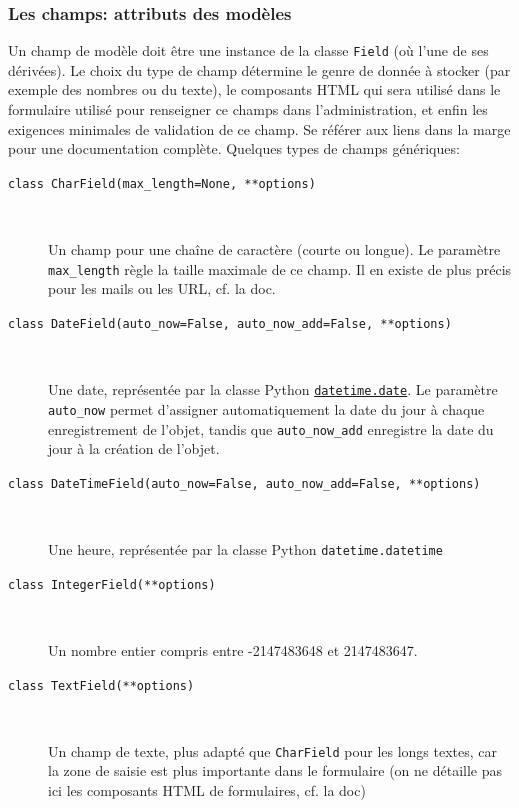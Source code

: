 \documentclass[a4paper, 10pt]{article}
\begin{document}
{\subsubsection{Les champs: attributs des modèles}

Un champ  de modèle doit être une instance de la classe \texttt{Field} (où l'une de ses dérivées). Le choix du type de champ détermine le genre de donnée à stocker (par exemple des nombres ou du texte), le composants HTML qui sera utilisé dans le formulaire utilisé pour renseigner ce champs dans l'administration, et enfin les exigences minimales de validation de ce champ. Se référer aux liens dans la marge pour une documentation complète. Quelques types de champs génériques:
\begin{description}
    \item[\texttt{class CharField(max_length=None, **options)}]~

    Un champ pour une chaîne de caractère (courte ou longue). Le paramètre \texttt{max\_length} règle la taille maximale de ce champ. Il en existe de plus précis pour les mails ou les URL, cf. la doc.

    \item[\texttt{class DateField(auto_now=False, auto_now_add=False, **options)}]~

    Une date, représentée par la classe Python \hyperref[datetime]{\texttt{datetime.date}}. Le paramètre \texttt{auto\_now} permet d'assigner automatiquement la date du jour à chaque enregistrement de l'objet, tandis que \texttt{auto\_now\_add} enregistre la date du jour à la création de l'objet.

    \item[\texttt{class DateTimeField(auto_now=False, auto_now_add=False, **options)}]~

    Une heure, représentée par la classe Python \texttt{datetime.datetime}

    \item[\texttt{class IntegerField(**options)}]~

    Un nombre entier compris entre -2147483648 et 2147483647.

    \item[\texttt{class TextField(**options)}]~

    Un champ de texte, plus adapté que \texttt{CharField} pour les longs textes, car la zone de saisie est plus importante dans le formulaire (on ne détaille pas ici les composants HTML de formulaires, cf. la doc)
\end{description}

}
\end{document}
